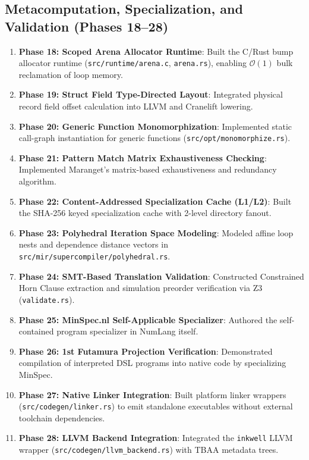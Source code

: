 \subsection{Metacomputation, Specialization, and Validation (Phases 18--28)}
\begin{enumerate}
    \item \textbf{Phase 18: Scoped Arena Allocator Runtime}: Built the C/Rust bump allocator runtime (\texttt{src/runtime/arena.c}, \texttt{arena.rs}), enabling $\mathcal{O}(1)$ bulk reclamation of loop memory.
    \item \textbf{Phase 19: Struct Field Type-Directed Layout}: Integrated physical record field offset calculation into LLVM and Cranelift lowering.
    \item \textbf{Phase 20: Generic Function Monomorphization}: Implemented static call-graph instantiation for generic functions (\texttt{src/opt/monomorphize.rs}).
    \item \textbf{Phase 21: Pattern Match Matrix Exhaustiveness Checking}: Implemented Maranget's matrix-based exhaustiveness and redundancy algorithm.
    \item \textbf{Phase 22: Content-Addressed Specialization Cache (L1/L2)}: Built the SHA-256 keyed specialization cache with 2-level directory fanout.
    \item \textbf{Phase 23: Polyhedral Iteration Space Modeling}: Modeled affine loop nests and dependence distance vectors in \texttt{src/mir/supercompiler/polyhedral.rs}.
    \item \textbf{Phase 24: SMT-Based Translation Validation}: Constructed Constrained Horn Clause extraction and simulation preorder verification via Z3 (\texttt{validate.rs}).
    \item \textbf{Phase 25: MinSpec.nl Self-Applicable Specializer}: Authored the self-contained program specializer in NumLang itself.
    \item \textbf{Phase 26: 1st Futamura Projection Verification}: Demonstrated compilation of interpreted DSL programs into native code by specializing MinSpec.
    \item \textbf{Phase 27: Native Linker Integration}: Built platform linker wrappers (\texttt{src/codegen/linker.rs}) to emit standalone executables without external toolchain dependencies.
    \item \textbf{Phase 28: LLVM Backend Integration}: Integrated the \texttt{inkwell} LLVM wrapper (\texttt{src/codegen/llvm\_backend.rs}) with TBAA metadata trees.
\end{enumerate}


